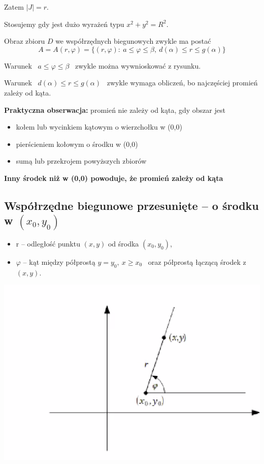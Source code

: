 Zatem $ |J| = r $.

Stosujemy gdy jest dużo wyrażeń typu $x^2 + y^2 = R^2 $.

Obraz zbioru $D$ we współrzędnych biegunowych zwykle ma postać
\[ A = A(r, \varphi) = \{ (r, \varphi): \ a \leq \varphi \leq \beta, \ d(\alpha) \leq r \leq g(\alpha) \} \]

Warunek \ $ a \leq \varphi \leq \beta $ \ zwykle można wywnioskować z rysunku.

Warunek \ $ d(\alpha) \leq r \leq g(\alpha) $ \ zwykle wymaga obliczeń, bo najczęściej promień zależy od kąta.

\textbf{Praktyczna obserwacja:} promień nie zależy od kąta, gdy obszar jest
\begin{itemize}
    \item kołem lub wycinkiem kątowym o wierzchołku w (0,0)
    \item pierścieniem kołowym o środku w (0,0)
    \item sumą lub przekrojem powyższych zbiorów
\end{itemize}

\textbf{Inny środek niż w (0,0) powoduje, że promień zależy od kąta}

\subsection*{Współrzędne biegunowe przesunięte -- o środku w $(x_0, y_0)$}
\begin{itemize}
    \item r -- odległość punktu $(x,y)$ od środka $(x_0, y_0)$,
    \item $\varphi$ -- kąt między półprostą $ y = y_0, \ x \geq x_0 $ \ oraz półprostą łączącą środek z $(x,y)$.
\end{itemize}

\begin{center}
\includegraphics[scale=0.5]{img/katbiegun.png}
\end{center}


